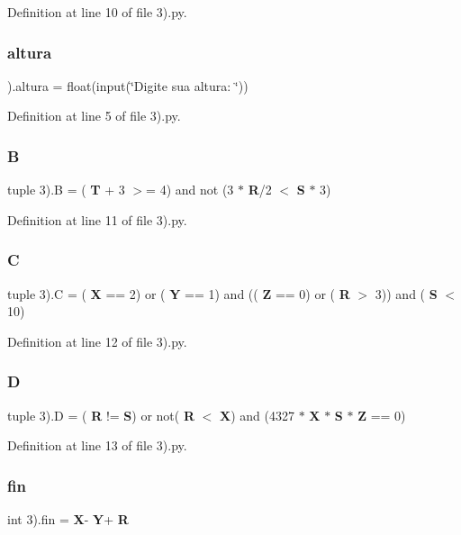 Definition at line 10 of file 3).\+py.

\mbox{\label{namespace3_08_a16da8c181d0cc70578b4f93c0977798f}} 
\subsubsection{altura}
{\footnotesize{}).altura = float(input(\char`\"{}Digite sua altura\+: \char`\"{}))}



Definition at line 5 of file 3).\+py.

\mbox{\label{namespace3_08_a43ad398133674a22e3f6e22fbb0745bd}} 
\subsubsection{B}
{\footnotesize\ttfamily tuple 3).B = (\textbf{ T} + 3 $>$= 4) and not (3 $\ast$ \textbf{ R}/2 $<$ \textbf{ S} $\ast$ 3)}



Definition at line 11 of file 3).\+py.

\mbox{\label{namespace3_08_aeaa126814bb5b26bca34049d0de78d63}} 
\subsubsection{C}
{\footnotesize\ttfamily tuple 3).C = (\textbf{ X} == 2) or (\textbf{ Y} == 1) and ((\textbf{ Z} == 0) or (\textbf{ R} $>$ 3)) and (\textbf{ S} $<$ 10)}



Definition at line 12 of file 3).\+py.

\mbox{\label{namespace3_08_a5e9f868c32da7cd7ab488162c745ed6b}} 
\subsubsection{D}
{\footnotesize\ttfamily tuple 3).D = (\textbf{ R} != \textbf{ S}) or not(\textbf{ R} $<$ \textbf{ X}) and (4327 $\ast$ \textbf{ X} $\ast$ \textbf{ S} $\ast$ \textbf{ Z} == 0)}



Definition at line 13 of file 3).\+py.

\mbox{\label{namespace3_08_aefd6ac0340d5fc5ca6b476b216cb344e}} 
\subsubsection{fin}
{\footnotesize\ttfamily int 3).fin = \textbf{ X}-\/\textbf{ Y}+\textbf{ R}}




